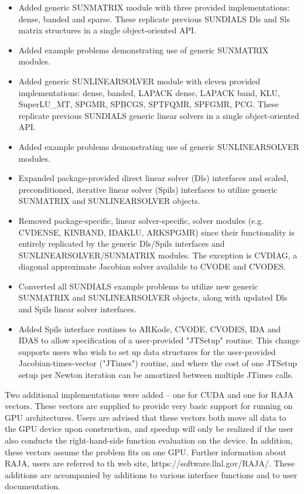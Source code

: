 \begin{itemize}
\item Added generic SUNMATRIX module with three provided implementations:
        dense, banded and sparse.  These replicate previous SUNDIALS Dls and
        Sls matrix structures in a single object-oriented API.
\item Added example problems demonstrating use of generic SUNMATRIX modules.
\item Added generic SUNLINEARSOLVER module with eleven provided
        implementations: dense, banded, LAPACK dense, LAPACK band, KLU,
        SuperLU\_MT, SPGMR, SPBCGS, SPTFQMR, SPFGMR, PCG.  These replicate
        previous SUNDIALS generic linear solvers in a single object-oriented
        API.
\item Added example problems demonstrating use of generic SUNLINEARSOLVER
        modules.
\item Expanded package-provided direct linear solver (Dls) interfaces and
        scaled, preconditioned, iterative linear solver (Spils) interfaces
        to utilize generic SUNMATRIX and SUNLINEARSOLVER objects.
\item Removed package-specific, linear solver-specific, solver modules
        (e.g. CVDENSE, KINBAND, IDAKLU, ARKSPGMR) since their functionality
        is entirely replicated by the generic Dls/Spils interfaces and
        SUNLINEARSOLVER/SUNMATRIX modules.  The exception is CVDIAG, a
        diagonal approximate Jacobian solver available to CVODE and CVODES.
\item Converted all SUNDIALS example problems to utilize new generic
        SUNMATRIX and SUNLINEARSOLVER objects, along with updated Dls and
        Spils linear solver interfaces.
\item Added Spils interface routines to ARKode, CVODE, CVODES, IDA and
        IDAS to allow specification of a user-provided "JTSetup" routine.
        This change supports users who wish to set up data structures for
        the user-provided Jacobian-times-vector ("JTimes") routine, and
        where the cost of one JTSetup setup per Newton iteration can be
        amortized between multiple JTimes calls.
\end{itemize}

Two additional {\nvector} implementations were added -- one for
CUDA and one for RAJA vectors.  
These vectors are supplied to provide very basic support for running
on GPU architectures.  Users are advised that these vectors both move all data
to the GPU device upon construction, and speedup will only be realized if the
user also conducts the right-hand-side function evaluation on the device.
In addition, these vectors assume the problem fits on one GPU.
Further information about RAJA, users are referred to th web site, 
https://software.llnl.gov/RAJA/.
These additions are accompanied by additions to various interface functions
and to user documentation.

